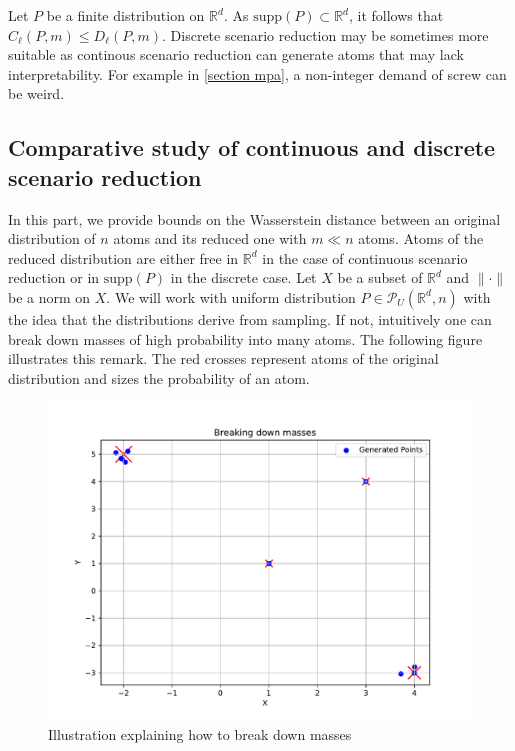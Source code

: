 \documentclass{amsart}
\newcommand{\RR}{\mathbb{R}}
\begin{document}
Let $P$ be a finite distribution on $\RR^d$. As $\text{supp}\left(P\right)\subset \RR^d$, it follows that $C_\ell\left(P,m\right)\leq D_\ell\left(P,m\right)$. Discrete scenario reduction may be sometimes more suitable as continous scenario reduction can generate atoms that may lack interpretability. For example in \ref{section mpa}, a non-integer demand of screw can be weird.

\subsection{Comparative study of continuous and discrete scenario reduction}\label{comparative}

In this part, we provide bounds on the Wasserstein distance between an original distribution of $n$ atoms and its reduced one with $m\ll n$ atoms. Atoms of the reduced distribution are either free in $\RR^d$ in the case of continuous scenario reduction or in $\text{supp}\left(P\right)$ in the discrete case. Let $X$ be a subset of $\RR^d$ and $\lVert \cdot \rVert$ be a norm on $X$. We will work with uniform distribution $P\in\mathcal{P}_U\left(\RR^d,n\right)$ with the idea that the distributions derive from sampling. If not, intuitively one can break down masses of high probability into many atoms. The following figure  illustrates this remark. The red crosses represent atoms of the original distribution and sizes the probability of an atom. \clearpage

\begin{figure}[!h]
    \centering
    \includegraphics[width=0.40\linewidth]{plots/break down.pdf}
    \caption{Illustration explaining how to break down masses}
    \label{break down}
\end{figure}
\end{document}
